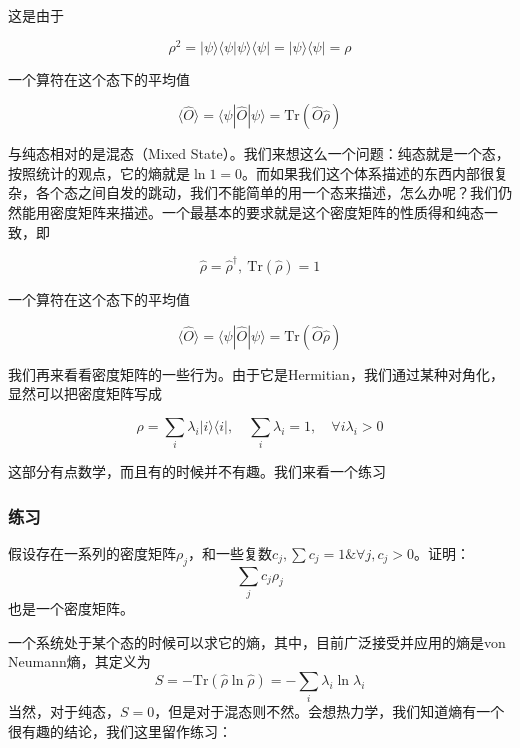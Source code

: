 这是由于

\begin{equation}
\rho^2 = |\psi\rangle\langle\psi|\psi\rangle\langle\psi| = |\psi\rangle\langle\psi| = \rho
\end{equation}

一个算符在这个态下的平均值

\begin{equation}
\langle\hat O\rangle = \langle\psi|\hat O|\psi\rangle = \text{Tr}(\hat O\hat \rho)
\end{equation}

与纯态相对的是混态（Mixed State）。我们来想这么一个问题：纯态就是一个态，按照统计的观点，它的熵就是$\ln 1 = 0$。而如果我们这个体系描述的东西内部很复杂，各个态之间自发的跳动，我们不能简单的用一个态来描述，怎么办呢？我们仍然能用密度矩阵来描述。一个最基本的要求就是这个密度矩阵的性质得和纯态一致，即

\begin{equation}
\hat\rho = \hat\rho^{\dagger},\ \text{Tr}(\hat\rho) = 1
\end{equation}

一个算符在这个态下的平均值

\begin{equation}
\langle\hat O\rangle = \langle\psi|\hat O|\psi\rangle = \text{Tr}(\hat O\hat \rho)
\end{equation}

我们再来看看密度矩阵的一些行为。由于它是Hermitian，我们通过某种对角化，显然可以把密度矩阵写成

\begin{equation}
\rho = \sum_i\lambda_i|i\rangle\langle i|,\quad \sum_i\lambda_i = 1,\quad \forall i\lambda_i > 0 
\end{equation}

这部分有点数学，而且有的时候并不有趣。我们来看一个练习

\subsubsection{练习}
假设存在一系列的密度矩阵$\rho_j$，和一些复数$c_j, \sum c_j = 1 \& \forall j, c_j>0$。证明：
\begin{equation}
\sum_j c_j \rho_j 
\end{equation}
也是一个密度矩阵。


一个系统处于某个态的时候可以求它的熵，其中，目前广泛接受并应用的熵是von Neumann熵，其定义为
\begin{equation}
S=-\text{Tr}(\hat\rho\ln\hat\rho)=-\sum_i\lambda_i\ln\lambda_i
\end{equation}
当然，对于纯态，$S=0$，但是对于混态则不然。会想热力学，我们知道熵有一个很有趣的结论，我们这里留作练习：


